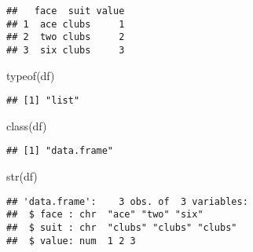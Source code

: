 \documentclass[
]{article}
\newenvironment{Shaded}{\begin{snugshade}}{\end{snugshade}}
\newcommand{\FunctionTok}[1]{\textcolor[rgb]{0.00,0.00,0.00}{#1}}
\newcommand{\NormalTok}[1]{#1}
\begin{document}
\begin{verbatim}
##   face  suit value
## 1  ace clubs     1
## 2  two clubs     2
## 3  six clubs     3
\end{verbatim}

\begin{Shaded}
\begin{Highlighting}[]
\FunctionTok{typeof}\NormalTok{(df)}
\end{Highlighting}
\end{Shaded}

\begin{verbatim}
## [1] "list"
\end{verbatim}

\begin{Shaded}
\begin{Highlighting}[]
\FunctionTok{class}\NormalTok{(df)}
\end{Highlighting}
\end{Shaded}

\begin{verbatim}
## [1] "data.frame"
\end{verbatim}

\begin{Shaded}
\begin{Highlighting}[]
\FunctionTok{str}\NormalTok{(df)}
\end{Highlighting}
\end{Shaded}

\begin{verbatim}
## 'data.frame':    3 obs. of  3 variables:
##  $ face : chr  "ace" "two" "six"
##  $ suit : chr  "clubs" "clubs" "clubs"
##  $ value: num  1 2 3
\end{verbatim}
\end{document}
